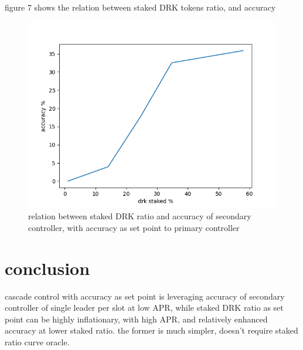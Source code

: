 \documentclass{article}
\begin{document}
\begin{description}
\item figure 7 shows the relation between staked DRK tokens ratio, and accuracy
\end{description}
\begin{figure}
  \includegraphics{acc_setpoint_vs_sr.png}
  \caption{relation between staked DRK ratio and accuracy of secondary controller, with accuracy as set point to primary controller}
\end{figure}


\section{conclusion}
cascade control with accuracy as set point is leveraging accuracy of secondary controller of single leader per slot at low APR, while staked DRK ratio as set point can be highly inflationary, with high APR, and relatively enhanced accuracy at lower staked ratio. the former is much simpler, doesn't require staked ratio curve oracle.
\end{document}
